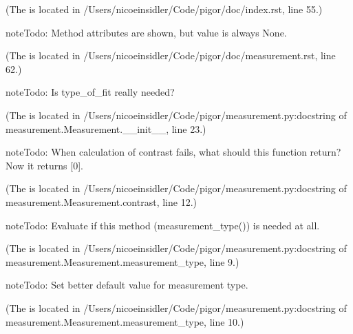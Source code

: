 \documentclass[letterpaper,10pt,english]{sphinxmanual}
\begin{document}
(The {\hyperref[\detokenize{index:index-0}]{}} is located in /Users/nicoeinsidler/Code/pigor/doc/index.rst, line 55.)

\begin{sphinxadmonition}{note}{Todo:}
Method attributes are shown, but value is always None.
\end{sphinxadmonition}

(The {\hyperref[\detokenize{measurement:index-0}]{}} is located in /Users/nicoeinsidler/Code/pigor/doc/measurement.rst, line 62.)

\begin{sphinxadmonition}{note}{Todo:}
Is type\_of\_fit really needed?
\end{sphinxadmonition}

(The {\hyperref[\detokenize{measurement:index-1}]{}} is located in /Users/nicoeinsidler/Code/pigor/measurement.py:docstring of measurement.Measurement.\_\_init\_\_, line 23.)

\begin{sphinxadmonition}{note}{Todo:}
When calculation of contrast fails, what should this function return? Now it returns {[}0{]}.
\end{sphinxadmonition}

(The {\hyperref[\detokenize{measurement:index-2}]{}} is located in /Users/nicoeinsidler/Code/pigor/measurement.py:docstring of measurement.Measurement.contrast, line 12.)

\begin{sphinxadmonition}{note}{Todo:}
Evaluate if this method (measurement\_type()) is needed at all.
\end{sphinxadmonition}

(The {\hyperref[\detokenize{measurement:index-3}]{}} is located in /Users/nicoeinsidler/Code/pigor/measurement.py:docstring of measurement.Measurement.measurement\_type, line 9.)

\begin{sphinxadmonition}{note}{Todo:}
Set better default value for measurement type.
\end{sphinxadmonition}

(The {\hyperref[\detokenize{measurement:index-4}]{}} is located in /Users/nicoeinsidler/Code/pigor/measurement.py:docstring of measurement.Measurement.measurement\_type, line 10.)
\end{document}
